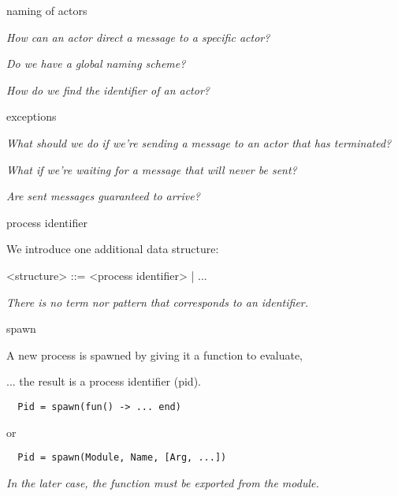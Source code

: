 \begin{frame}{naming of actors}

{\em How can an actor direct a message to a specific actor?}

\pause\vspace{20pt}
{\em Do we have a global naming scheme?}

\pause\vspace{20pt}
{\em How do we find the identifier of an actor?}
     
\end{frame}



\begin{frame}{exceptions}

{\em What should we do if we're sending a message to an actor that has terminated?}

\pause\vspace{20pt}
{\em What if we're waiting for a message that will never be sent?}

\pause\vspace{20pt}
{\em Are sent messages guaranteed to arrive?}

\end{frame}


\begin{frame}{process identifier}

We introduce one additional data structure:
\pause\vspace{20pt}

\begin{code}
 <structure> ::= <process identifier> | ...
\end{code}


\pause\vspace{20pt} 
{\em There is no term nor pattern that corresponds to an identifier.}
\end{frame}

\begin{frame}[fragile]{spawn}

  A new process is spawned by giving it a function to evaluate, \pause
  
  \vspace{10pt}\hspace{40pt}... the result is a process identifier (pid).

\pause\vspace{20pt}
\begin{verbatim}
  Pid = spawn(fun() -> ... end)
\end{verbatim}
\pause\vspace{10pt}
or
\pause\vspace{10pt}
\begin{verbatim}
  Pid = spawn(Module, Name, [Arg, ...])
\end{verbatim}
\pause\vspace{10pt}
{\em In the later case, the function must be exported from the module.}

\end{frame}

